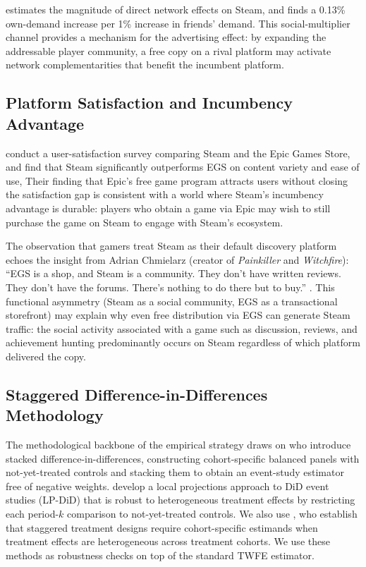 \documentclass[11pt]{article}
\begin{document}
\citet{tudon2022} estimates the magnitude of direct network effects on Steam, and 
finds a 0.13\% own-demand increase per 1\% increase in friends' demand. 
This social-multiplier channel provides a mechanism for the advertising effect: 
by expanding the addressable player community, a free copy on a rival platform may activate
network complementarities that benefit the incumbent platform.

\subsection{Platform Satisfaction and Incumbency Advantage}

\citet{nabil2025} conduct a user-satisfaction survey comparing Steam and the Epic Games
Store, and find that Steam significantly outperforms EGS on content variety and ease of use, 
Their finding that Epic's free game program attracts users without closing the satisfaction
gap is consistent with a world where Steam's incumbency advantage is durable: players
who obtain a game via Epic may wish to still purchase the game on Steam to 
engage with Steam's ecosystem.

The observation that gamers treat Steam as their default discovery platform echoes the
insight from Adrian Chmielarz (creator of \textit{Painkiller} and \textit{Witchfire}):
``EGS is a shop, and Steam is a community. They don't have written reviews. They don't
have the forums. There's nothing to do there but to buy.'' \citep{frvr2026}. 
This functional asymmetry (Steam as a social community, EGS as a transactional storefront)
may explain why even free distribution via EGS can generate Steam traffic: the social
activity associated with a game such as discussion, reviews, and achievement hunting predominantly
occurs on Steam regardless of which platform delivered the copy.

\subsection{Staggered Difference-in-Differences Methodology}

The methodological backbone of the empirical strategy draws on 
\citet{cengiz2019} who introduce
stacked difference-in-differences, constructing cohort-specific balanced panels with
not-yet-treated controls and stacking them to obtain an event-study estimator free
of negative weights. \citet{dube2023} develop a local projections approach to DiD
event studies (LP-DiD) that is robust to heterogeneous treatment effects by restricting
each period-$k$ comparison to not-yet-treated controls. We also use \citet{callaway2021},
who establish that staggered treatment designs require cohort-specific estimands 
when treatment effects are heterogeneous across treatment cohorts. 
We use these methods as robustness checks on top of the standard TWFE estimator.
\end{document}
